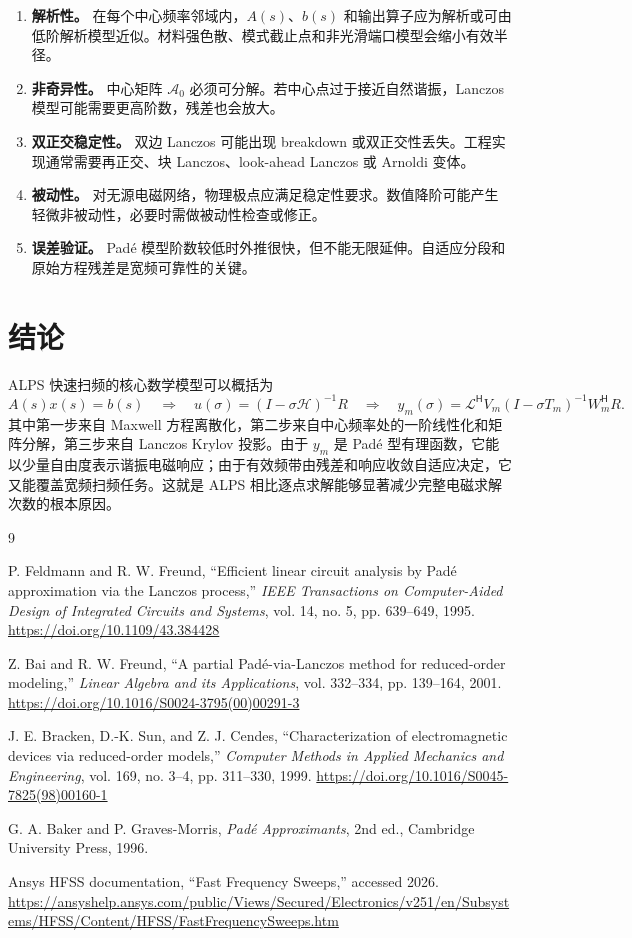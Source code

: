 \documentclass[UTF8,a4paper,11pt]{ctexart}
\newcommand{\cA}{\mathcal{A}}
\newcommand{\cH}{\mathcal{H}}
\newcommand{\cL}{\mathcal{L}}
\newcommand{\herm}{\mathsf{H}}
\begin{document}
\begin{enumerate}
    \item \textbf{解析性。} 在每个中心频率邻域内，$A(s)$、$b(s)$ 和输出算子应为解析或可由低阶解析模型近似。材料强色散、模式截止点和非光滑端口模型会缩小有效半径。
    \item \textbf{非奇异性。} 中心矩阵 $\cA_0$ 必须可分解。若中心点过于接近自然谐振，Lanczos 模型可能需要更高阶数，残差也会放大。
    \item \textbf{双正交稳定性。} 双边 Lanczos 可能出现 breakdown 或双正交性丢失。工程实现通常需要再正交、块 Lanczos、look-ahead Lanczos 或 Arnoldi 变体。
    \item \textbf{被动性。} 对无源电磁网络，物理极点应满足稳定性要求。数值降阶可能产生轻微非被动性，必要时需做被动性检查或修正。
    \item \textbf{误差验证。} Padé 模型阶数较低时外推很快，但不能无限延伸。自适应分段和原始方程残差是宽频可靠性的关键。
\end{enumerate}

\section{结论}

ALPS 快速扫频的核心数学模型可以概括为
\[
    A(s)x(s)=b(s)
    \quad\Longrightarrow\quad
    u(\sigma)=(I-\sigma\cH)^{-1}R
    \quad\Longrightarrow\quad
    y_m(\sigma)=
    \cL^{\herm}V_m(I-\sigma T_m)^{-1}W_m^{\herm}R .
\]
其中第一步来自 Maxwell 方程离散化，第二步来自中心频率处的一阶线性化和矩阵分解，第三步来自 Lanczos Krylov 投影。由于 $y_m$ 是 Padé 型有理函数，它能以少量自由度表示谐振电磁响应；由于有效频带由残差和响应收敛自适应决定，它又能覆盖宽频扫频任务。这就是 ALPS 相比逐点求解能够显著减少完整电磁求解次数的根本原因。

\begin{thebibliography}{9}

P. Feldmann and R. W. Freund,
``Efficient linear circuit analysis by Padé approximation via the Lanczos process,''
\emph{IEEE Transactions on Computer-Aided Design of Integrated Circuits and Systems},
vol. 14, no. 5, pp. 639--649, 1995.
\url{https://doi.org/10.1109/43.384428}

Z. Bai and R. W. Freund,
``A partial Padé-via-Lanczos method for reduced-order modeling,''
\emph{Linear Algebra and its Applications},
vol. 332--334, pp. 139--164, 2001.
\url{https://doi.org/10.1016/S0024-3795(00)00291-3}

J. E. Bracken, D.-K. Sun, and Z. J. Cendes,
``Characterization of electromagnetic devices via reduced-order models,''
\emph{Computer Methods in Applied Mechanics and Engineering},
vol. 169, no. 3--4, pp. 311--330, 1999.
\url{https://doi.org/10.1016/S0045-7825(98)00160-1}

G. A. Baker and P. Graves-Morris,
\emph{Padé Approximants},
2nd ed., Cambridge University Press, 1996.

Ansys HFSS documentation,
``Fast Frequency Sweeps,''
accessed 2026.
\url{https://ansyshelp.ansys.com/public/Views/Secured/Electronics/v251/en/Subsystems/HFSS/Content/HFSS/FastFrequencySweeps.htm}

\end{thebibliography}
\end{document}

